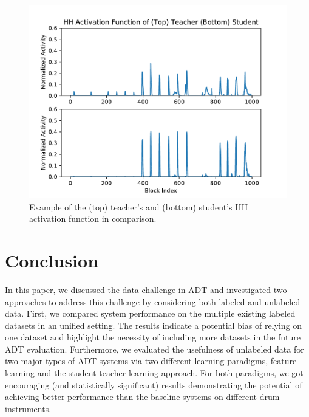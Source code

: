 \documentclass{article}
\begin{document}
\begin{figure}
\centering
\includegraphics[width = \columnwidth]{./figs/example_activ.pdf}
\caption{Example of the (top) teacher's and (bottom) student's HH activation function in comparison.}
\label{fig:exampleActiv}
\end{figure}


\section{Conclusion}
\label{sec:conc}

In this paper, we discussed the data challenge in ADT and investigated two approaches to address this challenge by considering both labeled and unlabeled data. First, we compared system performance on the multiple existing labeled datasets in an unified setting. The results indicate a potential bias of relying on one dataset and highlight the necessity of including more datasets in the future ADT evaluation. Furthermore, we evaluated the usefulness of unlabeled data for two major types of ADT systems via two different learning paradigms, feature learning and the student-teacher learning approach. For both paradigms, we got encouraging (and statistically significant) results demonstrating the potential of achieving better performance than the baseline systems on different drum instruments.
\end{document}
